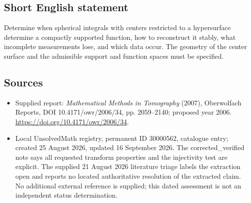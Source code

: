 \documentclass[11pt]{article}
\begin{document}
\subsection{Short English statement}
Determine when spherical integrals with centers restricted to a hypersurface determine a compactly supported function, how to reconstruct it stably, what incomplete measurements lose, and which data occur. The geometry of the center surface and the admissible support and function spaces must be specified.
\subsection{Sources}
\begin{itemize}
\item Supplied report: \emph{Mathematical Methods in Tomography} (2007), Oberwolfach Reports, DOI 10.4171/owr/2006/34, pp. 2059--2140; proposed year 2006. \url{https://doi.org/10.4171/owr/2006/34}.
\item Local UnsolvedMath registry, permanent ID 30000562, catalogue entry; created 25 August 2026, updated 16 September 2026. The corrected\_verified note says all requested transform properties and the injectivity test are explicit. The supplied 21 August 2026 literature triage labels the extraction open and reports no located authoritative resolution of the extracted claim. No additional external reference is supplied; this dated assessment is not an independent status determination.
\end{itemize}
\end{document}

